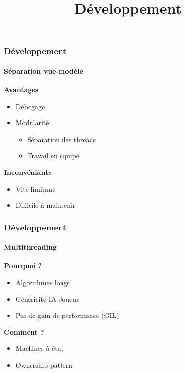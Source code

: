 \title{Développement}
\subtitle{}
\author{}
\institute{}
\date{}
\begin{frame}
	\maketitle
\end{frame}

\begin{frame}
	\frametitle{Développement}
	\framesubtitle{Séparation vue-modèle}
	\textbf{Avantages}
	\begin{itemize}
		\item Débogage
		\item Modularité
		\begin{itemize}
			\item Séparation des threads
			\item Travail en équipe
		\end{itemize}
	\end{itemize}

	\textbf{Inconvéniants}
	\begin{itemize}
		\item Vite limitant
		\item Difficile à maintenir
	\end{itemize}
\end{frame}

\begin{frame}
	\frametitle{Développement}
	\framesubtitle{Multithreading}

	\textbf{Pourquoi ?}
	\begin{itemize}
		\item Algorithmes longs
		\item Généricité IA-Joueur
		\item Pas de gain de performance (GIL)
	\end{itemize}
	\textbf{Comment ?}
	\begin{itemize}
		\item Machines à état
		\item Ownership pattern
	\end{itemize}
\end{frame}

